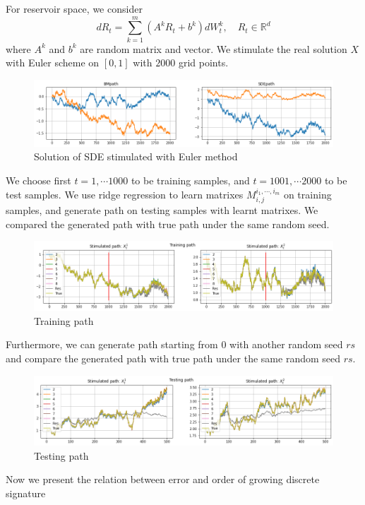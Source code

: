 \documentclass[12pt]{report}
\theoremstyle{definition}
\theoremstyle{remark}
\newcommand{\R}{\mathbb{R}}
\begin{document}
For reservoir space, we consider 
\begin{equation}
  dR_{t} = \sum_{k=1}^{m}(A^{k}R_{t} + b^{k})dW^{k}_{t},\quad R_{t}\in\R^{d}
\end{equation}
where $A^{k}$ and $b^{k}$ are random matrix and vector. We stimulate the real solution $X$ with Euler scheme on $[0,1]$ with $2000$ grid points. 
\begin{figure}[H]
    \centering
    \includegraphics[width=\textwidth]{figs/res1.png}
    \caption{Solution of SDE stimulated with Euler method}
\end{figure}
We choose first $t=1,\cdots 1000$ to be training samples, and $t=1001,\cdots 2000$ to be test samples. We use ridge regression to learn matrixes $M^{i_{1},\cdots,i_{m}}_{i,j}$ on training samples, and generate path on testing samples with learnt matrixes. We compared the generated path with true path under the same random seed. 
\begin{figure}[H]
    \centering
    \includegraphics[width=\textwidth]{figs/res2.png}
    \caption{Training path}
\end{figure}
Furthermore, we can generate path starting from $0$ with another random seed $rs$ and compare the generated path with true path under the same random seed $rs$. 
\begin{figure}[H]
    \centering
    \includegraphics[width=\textwidth]{figs/res3.png}
    \caption{Testing path}
\end{figure}
Now we present the relation between error and order of growing discrete signature 
\end{document}
